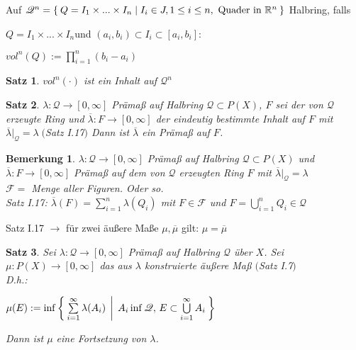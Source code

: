 \documentclass[11pt]{memoir}
\theoremstyle{changebreak}
\newtheorem{Bemerkung}{Bemerkung}[chapter]
\newtheorem{Satz}{Satz}[chapter]
\begin{document}
Auf $\mathscr Q^n = \Set{Q = I_1 \times ... \times I_n| I_i \in J, 1 \leq i \leq n, \text{ Quader in }\mathbb R^n }$ Halbring, falls 
\begin{center}
	$Q = I_1 \times ... \times I_n$\quad und \quad  $(a_i, b_i) \subset I_i \subset [a_i, b_i]$:
\end{center}
\begin{center}
	$vol^n(Q) := \prod\limits_{i=1}^n (b_i - a_i)$
\end{center}

\begin{Satz}
$vol^n(\cdotp)$ ist ein Inhalt auf $\mathscr Q^n$
\end{Satz}

\begin{Satz}
$\lambda: \mathscr Q \rightarrow [0, \infty]$ Prämaß auf Halbring $\mathscr Q \subset P(X)$, $F$ sei der von $\mathscr Q$ erzeugte Ring und $\overline{\lambda}: F \rightarrow [0, \infty]$ der eindeutig bestimmte Inhalt auf $F$ mit $\overline{\lambda}|_\mathscr Q = \lambda \; ($Satz I.17$)$
Dann ist $\overline{\lambda}$ ein Prämaß auf $F$.
\end{Satz}



\begin{Bemerkung}
$\lambda: \mathscr Q \rightarrow [0, \infty]$ Prämaß auf Halbring $\mathscr Q \subset P(X)$ und $\overline{\lambda} : F \rightarrow [0, \infty]$ Prämaß auf dem von $\mathscr Q$ erzeugten Ring $F$ mit $\overline{\lambda}|_\mathscr Q = \lambda$ \\

$\mathscr  F =$ Menge aller Figuren. Oder so. \\

Satz I.17: $\overline{\lambda}(F) = \sum\limits_{i=1}^n \lambda(Q_i)$ mit $F \in \mathscr F$ und $F = \bigcup\limits_{i=1}^n Q_i \in \mathscr Q$

\end{Bemerkung}

Satz I.17 $\rightarrow$ für zwei äußere Maße $\mu, \overline{\mu}$ gilt: $\mu = \overline{\mu}$


\begin{Satz}
Sei $\lambda: \mathscr Q \rightarrow [0, \infty]$ Prämaß auf Halbring $\mathscr Q$ über $X$. Sei $\mu: P(X) \rightarrow [0, \infty]$ das aus $\lambda$ konstruierte äußere Maß $($Satz I.7$)$ \\
D.h.:
\begin{center}
	$\mu(E) := \inf\Set{\sum\limits_{i=1}^\infty \lambda(A_i) \, |\, A_i \inf\mathscr Q, \, E \subset \bigcup\limits_{i=1}^\infty A_i }$
\end{center}
Dann ist $\mu$ eine Fortsetzung von $\lambda$.
\end{Satz}
\end{document}
